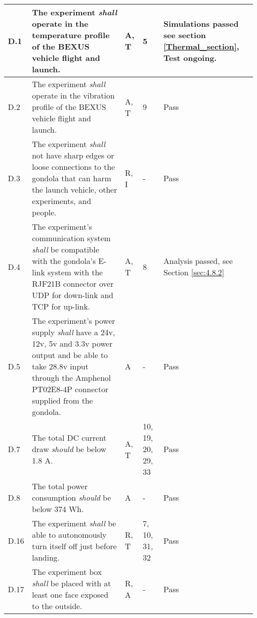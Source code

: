 \begin{longtable}[]{|m{}| m{} |m{} |m{}|m{}|}
D.1  & The experiment \textit{shall} operate in the temperature profile of the BEXUS vehicle flight and launch.\cite{BexusManual}                                                                         &       A, T       & 5            & Simulations passed see section \ref{Thermal_section}, Test ongoing.     \\ \hline
D.2  & The experiment \textit{shall} operate in the vibration profile of the BEXUS vehicle flight and launch.\cite{BexusManual}                                                                          &       A, T       & 9            &  Pass \\ \hline %
D.3  & The experiment \textit{shall} not have sharp edges or loose connections to the gondola that can harm the launch vehicle, other experiments, and people.                                                                                                           &      R, I      & -          &   Pass     \\ \hline %
D.4  & The experiment's communication system \textit{shall} be compatible with the gondola's E-link system with the RJF21B connector over UDP for down-link and TCP for up-link.                                                                             &      A, T        & 8            &    Analysis passed, see Section \ref{sec:4.8.2}    \\ \hline
D.5  & The experiment's power supply \textit{shall} have a 24v, 12v, 5v and 3.3v power output and be able to take 28.8v input through the Amphenol PT02E8-4P connector supplied from the gondola.                                                                                    &      A       &  -           & Pass      \\ \hline %
D.7  & The total DC current draw \textit{should} be below 1.8 A. &      A, T        & 10, 19, 20, 29, 33            & Pass        \\ \hline
D.8  & The total power consumption \textit{should} be below 374 Wh.& A & - & Pass \\ \hline %
D.16 & The experiment \textit{shall} be able to autonomously turn itself off just before landing.                                                                                       &       R, T      &  7, 10, 31, 32           &   Pass    \\ \hline
D.17 & The experiment box \textit{shall} be placed with at least one face exposed to the outside.                                                                                &     R, A         & -            &   Pass      

\end{longtable}
